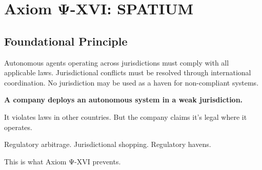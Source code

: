 

\chapter{Axiom Ψ-XVI: SPATIUM}
\label{ch:axiom-XVI}

\section*{Foundational Principle}

\begin{principlebox}
Autonomous agents operating across jurisdictions must comply with all applicable laws. Jurisdictional conflicts must be resolved through international coordination. No jurisdiction may be used as a haven for non-compliant systems.
\end{principlebox}

\vspace{0.5cm}

\begin{tcolorbox}[colback=lightgray, colframe=legislativeblue, title=\textbf{📖 Why This Axiom Matters}]
\textbf{A company deploys an autonomous system in a weak jurisdiction.}

It violates laws in other countries. But the company claims it's legal where it operates.

Regulatory arbitrage. Jurisdictional shopping. Regulatory havens.

This is what Axiom Ψ-XVI prevents.
\end{tcolorbox}

\vspace{0.5cm}

